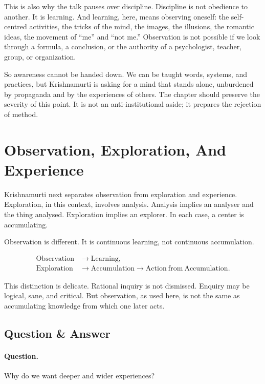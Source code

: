 This is also why the talk pauses over discipline. Discipline is not obedience to another. It is learning. And learning, here, means observing oneself: the self-centred activities, the tricks of the mind, the images, the illusions, the romantic ideas, the movement of ``me'' and ``not me.'' Observation is not possible if we look through a formula, a conclusion, or the authority of a psychologist, teacher, group, or organization.

So awareness cannot be handed down. We can be taught words, systems, and practices, but Krishnamurti is asking for a mind that stands alone, unburdened by propaganda and by the experiences of others. The chapter should preserve the severity of this point. It is not an anti-institutional aside; it prepares the rejection of method.

\section{Observation, Exploration, And Experience}

Krishnamurti next separates observation from exploration and experience. Exploration, in this context, involves analysis. Analysis implies an analyser and the thing analysed. Exploration implies an explorer. In each case, a center is accumulating.

Observation is different. It is continuous learning, not continuous accumulation.

\begin{align}
\mathrm{Observation} &\longrightarrow \mathrm{Learning},\\
\mathrm{Exploration} &\longrightarrow \mathrm{Accumulation}
\longrightarrow \mathrm{Action\ from\ Accumulation}.
\end{align}

This distinction is delicate. Rational inquiry is not dismissed. Enquiry may be logical, sane, and critical. But observation, as used here, is not the same as accumulating knowledge from which one later acts.

\subsection{Question \& Answer}

\paragraph{Question.}
Why do we want deeper and wider experiences?

